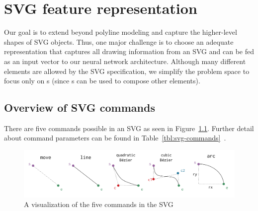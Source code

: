 \chapter{SVG feature representation}\label{chap:features}
Our goal is to extend beyond polyline modeling and capture the higher-level shapes of SVG objects.
Thus, one major challenge is to choose an adequate representation that captures all drawing information from an SVG and can be fed as an input vector to our neural network architecture.
Although many different elements are allowed by the SVG specification, we simplify the problem space to focus only on s (since s can be used to compose other elements). 

\section{Overview of SVG commands}
There are five commands possible in an SVG  as seen in Figure~\ref{fig:svg-commands}. Further detail about command parameters can be found in Table~\ref{tbl:svg-commands}~\cite{grasso2011svg}.

\begin{figure}[h]
    \centering
	\includegraphics[width=\textwidth]{figures/commands}
    \caption{A visualization of the five commands in the SVG \label{fig:svg-commands}}
\end{figure}


